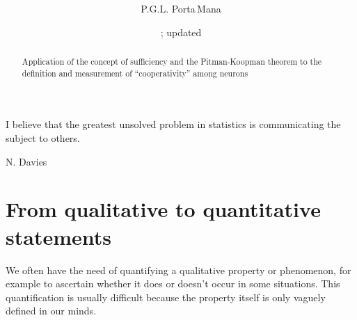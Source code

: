 \documentclass[\ifafour a4paper,12pt,\else a5paper,10pt,\fi%
onecolumn,oneside,article,%
british%
]{memoir}
\title{\propertitle%
}
\author{%
\hspace*{\stretch{1}}%
\parbox{0.5\linewidth}%
{\protect\centering P.G.L. Porta\,Mana\\%
\footnotesize\epost{\email{piero.mana}{ntnu.no}}}%
\hspace*{\stretch{1}}%
}
\date{\firstdraft; updated \updated}
\theoremstyle{remark}
\theoremstyle{innote}
\newcommand*{\citep}{\parencites}
\newcommand*{\asudedication}[1]{%
{\par\centering\textit{#1}\par}}
\renewcommand*{\|}{\mathpunct{|}}
\begin{document}
\captiondelim{\quad}\captionnamefont{\footnotesize}\captiontitlefont{\footnotesize}
\frenchspacing

\maketitle
\ifpublic
\abstractrunin
\abslabeldelim{}
\renewcommand*{\abstractname}{}
\setlength{\absleftindent}{0pt}
\setlength{\absrightindent}{0pt}
\setlength{\abstitleskip}{-\absparindent}
\begin{abstract}%
  \noindent Application of the concept of sufficiency and the
  Pitman-Koopman theorem to the definition and measurement of
  \enquote{cooperativity} among neurons
\end{abstract}\fi

\frenchspacing

\setlength{\epigraphwidth}{.63\columnwidth}
\epigraphfontsize{\footnotesize}
\setlength{\epigraphrule}{0pt}
\epigraph{I believe that the greatest unsolved problem in statistics is
  communicating the subject to others.}{N. Davies
  \citep[p.~445]{copasetal1995}}

\section{From qualitative to quantitative statements}
\label{sec:intro}

We often have the need of quantifying a qualitative property or phenomenon,
for example to ascertain whether it does or doesn't occur in some
situations. This quantification is usually difficult because the property
itself is only vaguely defined in our minds.
\end{document}
